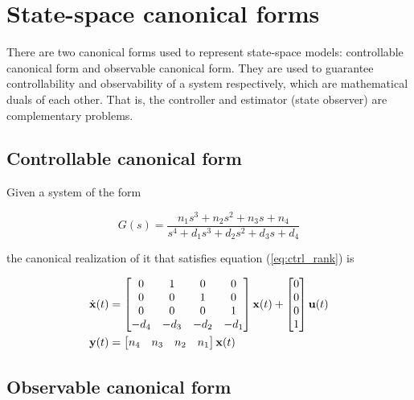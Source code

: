 \chapter{State-space canonical forms}

There are two canonical forms used to represent state-space \glspl{model}:
controllable canonical form and observable canonical form. They are used to
guarantee controllability and observability of a \gls{system} respectively,
which are mathematical duals of each other. That is, the controller and
estimator (\gls{state} \gls{observer}) are complementary problems.

\section{Controllable canonical form} \label{sec:ctrl-canon}

Given a \gls{system} of the form

\begin{equation} \label{eq:ctrl_obsv_tf}
  G(s) = \frac{n_1 s^3 + n_2 s^2 + n_3 s + n_4}
    {s^4 + d_1 s^3 + d_2 s^2 + d_3 s + d_4}
\end{equation}

the canonical \gls{realization} of it that satisfies equation
(\ref{eq:ctrl_rank}) is

\begin{align}
  \dot{\mathbf{x}}(t) &=
  \begin{bmatrix}
    0 & 1 & 0 & 0 \\
    0 & 0 & 1 & 0 \\
    0 & 0 & 0 & 1 \\
    -d_4 & -d_3 & -d_2 & -d_1
  \end{bmatrix}
  \mathbf{x}(t) +
  \begin{bmatrix}
    0 \\
    0 \\
    0 \\
    1
  \end{bmatrix}
  \mathbf{u}(t) \\
  \mathbf{y}(t) &=
  \begin{bmatrix}
    n_4 & n_3 & n_2 & n_1
  \end{bmatrix}
  \mathbf{x}(t)
\end{align}

\section{Observable canonical form} \label{sec:obsv-canon}

